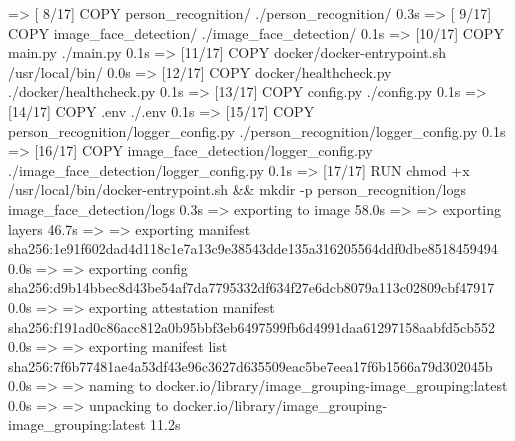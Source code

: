  => [ 8/17] COPY person_recognition/ ./person_recognition/                                                                                     0.3s
 => [ 9/17] COPY image_face_detection/ ./image_face_detection/                                                                                 0.1s
 => [10/17] COPY main.py ./main.py                                                                                                             0.1s
 => [11/17] COPY docker/docker-entrypoint.sh /usr/local/bin/                                                                                   0.0s
 => [12/17] COPY docker/healthcheck.py ./docker/healthcheck.py                                                                                 0.1s
 => [13/17] COPY config.py ./config.py                                                                                                         0.1s
 => [14/17] COPY .env ./.env                                                                                                                   0.1s
 => [15/17] COPY person_recognition/logger_config.py ./person_recognition/logger_config.py                                                     0.1s
 => [16/17] COPY image_face_detection/logger_config.py ./image_face_detection/logger_config.py                                                 0.1s
 => [17/17] RUN chmod +x /usr/local/bin/docker-entrypoint.sh     && mkdir -p person_recognition/logs image_face_detection/logs                 0.3s
 => exporting to image                                                                                                                        58.0s
 => => exporting layers                                                                                                                       46.7s
 => => exporting manifest sha256:1e91f602dad4d118c1e7a13c9e38543dde135a316205564ddf0dbe8518459494                                              0.0s
 => => exporting config sha256:d9b14bbec8d43be54af7da7795332df634f27e6dcb8079a113c02809cbf47917                                                0.0s
 => => exporting attestation manifest sha256:f191ad0c86acc812a0b95bbf3eb6497599fb6d4991daa61297158aabfd5cb552                                  0.0s
 => => exporting manifest list sha256:7f6b77481ae4a53df43e96c3627d635509eac5be7eea17f6b1566a79d302045b                                         0.0s
 => => naming to docker.io/library/image_grouping-image_grouping:latest                                                                        0.0s
 => => unpacking to docker.io/library/image_grouping-image_grouping:latest                                                                    11.2s
